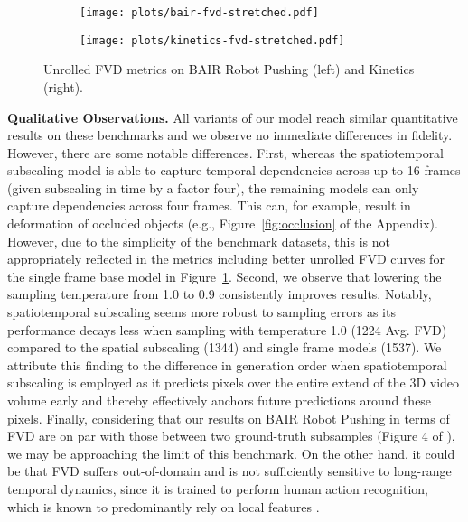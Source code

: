 \documentclass{article} \usepackage{iclr2020_conference,times}
\begin{document}
\begin{figure}[t]
    \centering
    \captionsetup{font=small}
    \begin{subfigure}{0.45\textwidth}
    \centering
    \texttt{[image: plots/bair-fvd-stretched.pdf]}
    \vspace{-1em}
    \subcaption{}
    \label{fig:bair_fvd}
    \end{subfigure}
\quad
    \begin{subfigure}{0.45\textwidth}
    \centering
    \texttt{[image: plots/kinetics-fvd-stretched.pdf]}
    \vspace{-1em}
    \subcaption{}
    \label{fig:kinetics_fvd}
    \end{subfigure}
\caption{Unrolled FVD metrics on BAIR Robot Pushing (left) and Kinetics (right).}
\end{figure}

\textbf{Qualitative Observations.}
All variants of our model reach similar quantitative results on these benchmarks and we observe no immediate differences in fidelity. However, there are some notable differences. First, whereas the spatiotemporal subscaling model is able to capture temporal dependencies across up to 16 frames (given subscaling in time by a factor four), the remaining models can only capture dependencies across four frames. This can, for example, result in deformation of occluded objects (e.g., Figure~\ref{fig:occlusion} of the Appendix). However, due to the simplicity of the benchmark datasets, this is not appropriately reflected in the metrics including better unrolled FVD curves for the single frame base model in Figure~\ref{fig:bair_fvd}.
Second, we observe that lowering the sampling temperature from 1.0 to 0.9 consistently improves results. Notably, spatiotemporal subscaling seems more robust to sampling errors as its performance decays less when sampling with temperature 1.0 (1224 Avg. FVD) compared to the spatial subscaling (1344) and single frame models (1537). We attribute this finding to the difference in generation order when spatiotemporal subscaling is employed as it predicts pixels over the entire extend of the 3D video volume early and thereby effectively anchors future predictions around these pixels.
Finally, considering that our results on BAIR Robot Pushing in terms of FVD are on par with those between two ground-truth subsamples (Figure 4 of \citet{Unterthiner2018FVD}), we may be approaching the limit of this benchmark. On the other hand, it could be that FVD suffers out-of-domain and is not sufficiently sensitive to long-range temporal dynamics, since it is trained to perform human action recognition, which is known to predominantly rely on local features \citep{Carreira2017QuoVA,Xie2018RethinkingSF}.
\end{document}
